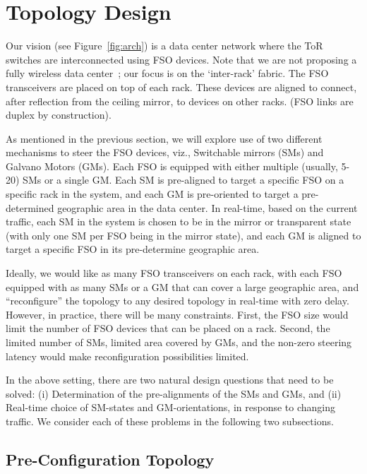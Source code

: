 \section{Topology Design}
\label{sec:top}

Our vision (see Figure~\ref{fig:arch}) is a data center network where
the ToR switches are interconnected using FSO devices.  Note that we
are not proposing a fully wireless data center~\cite{cornell}; our
focus is on the `inter-rack' fabric. The FSO transceivers are placed
on top of each rack.  These devices are aligned to connect, after
reflection from the ceiling mirror, to devices on other racks.  (FSO
links are duplex by construction). 

As mentioned in the previous section, we will explore use of two
different mechanisms to steer the FSO devices, viz., Switchable
mirrors (SMs) and Galvano Motors (GMs). Each FSO is equipped with
either multiple (usually, 5-20) SMs or a single GM. Each SM is
pre-aligned to target a specific FSO on a specific rack in the system,
and each GM is pre-oriented to target a pre-determined geographic area
in the data center. In real-time, based on the current traffic, each
SM in the system is chosen to be in the mirror or transparent state
(with only one SM per FSO being in the mirror state), and each GM is
aligned to target a specific FSO in its pre-determine geographic area.

Ideally, we would like as many FSO transceivers on each rack, with
each FSO equipped with as many SMs or a GM that can cover a large
geographic area, and ``reconfigure'' the topology to any desired
topology in real-time with zero delay. However, in practice, there
will be many constraints.  First, the FSO size would limit the number
of FSO devices that can be placed on a rack. Second, the limited
number of SMs, limited area covered by GMs, and the non-zero steering
latency would make reconfiguration possibilities limited.

In the above setting, there are two natural design questions that need
to be solved: (i) Determination of the pre-alignments of the SMs and
GMs, and (ii) Real-time choice of SM-states and GM-orientations, in
response to changing traffic. We consider each of these problems in 
the following two subsections.

\subsection{Pre-Configuration Topology}

